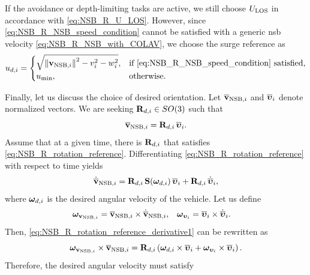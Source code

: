 If the avoidance or depth-limiting tasks are active, we still choose $U_{\rm LOS}$ in accordance with \eqref{eq:NSB_R_U_LOS}.
However, since \eqref{eq:NSB_R_NSB_speed_condition} cannot be satisfied with a generic \gls{nsb} velocity \eqref{eq:NSB_R_NSB_with_COLAV}, we choose the surge reference as 
\begin{equation}
    u_{d, i} = 
    \begin{cases}
        \sqrt{\left\|\mathbf{v}_{{\rm NSB}, i}\right\|^2 - v_i^2 - w_i^2},  &\text{if \eqref{eq:NSB_R_NSB_speed_condition} satisfied,} \\
        u_{\rm min}, &\text{otherwise}.
    \end{cases}
\end{equation}


Finally, let us discuss the choice of desired orientation.
Let $\overline{\mathbf{v}}_{{\rm NSB}, i}$ and $\overline{\bm{\upsilon}}_{i}$ denote normalized vectors.
We are seeking $\mathbf{R}_{d, i} \in SO(3)$ such that 
\begin{equation}
    \overline{\mathbf{v}}_{{\rm NSB}, i} = \mathbf{R}_{d, i}\,\overline{\bm{\upsilon}}_{i}.
    \label{eq:NSB_R_rotation_reference}
\end{equation}
Assume that at a given time, there is $\mathbf{R}_{d, i}$ that satisfies \eqref{eq:NSB_R_rotation_reference}.
Differentiating \eqref{eq:NSB_R_rotation_reference} with respect to time yields 
\begin{equation}
    \dot{\overline{\mathbf{v}}}_{{\rm NSB}, i} = \mathbf{R}_{d, i}\,\mathbf{S}(\bm{\omega}_{d, i})\,\overline{\bm{\upsilon}}_{i} + \mathbf{R}_{d, i}\,\dot{\overline{\bm{\upsilon}}}_{i},
    \label{eq:NSB_R_rotation_reference_derivative1}
\end{equation}
where $\bm{\omega}_{d, i}$ is the desired angular velocity of the vehicle.     
Let us define
\begin{align}
    \bm{\omega}_{\mathbf{v}_{{\rm NSB}, i}} &= \overline{\mathbf{v}}_{{\rm NSB}, i} \times \dot{\overline{\mathbf{v}}}_{{\rm NSB}, i}, &
    \bm{\omega}_{\bm{\upsilon}_{i}} &= \overline{\bm{\upsilon}}_{i} \times \dot{\overline{\bm{\upsilon}}}_{i}.
    \label{eq:NSB_R_omega_v}
\end{align}    
Then, \eqref{eq:NSB_R_rotation_reference_derivative1} can be rewritten as 
\begin{equation}
    \bm{\omega}_{\mathbf{v}_{{\rm NSB}, i}} \times \overline{\mathbf{v}}_{{\rm NSB}, i} = 
    \mathbf{R}_{d, i} \left( \bm{\omega}_{d, i} \times \overline{\bm{\upsilon}}_{i} + \bm{\omega}_{\bm{\upsilon}_{i}} \times \overline{\bm{\upsilon}}_{i} \right).
\end{equation}
Therefore, the desired angular velocity must satisfy 

